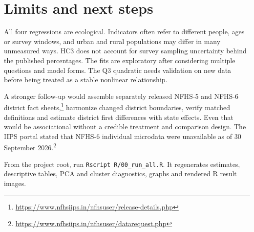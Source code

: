 \documentclass[11pt,a4paper]{article}
\begin{document}
\section{Limits and next steps}

All four regressions are ecological. Indicators often refer to
different people, ages or survey windows, and urban and rural
populations may differ in many unmeasured ways. HC3 does not account
for survey sampling uncertainty behind the published percentages.
The fits are exploratory after considering multiple questions and
model forms. The Q3 quadratic needs validation on new data before
being treated as a stable nonlinear relationship.

A stronger follow-up would assemble separately released NFHS-5
and NFHS-6 district fact sheets,\footnote{\url{https://www.nfhsiips.in/nfhsuser/release-details.php}}
harmonize changed district boundaries, verify matched definitions
and estimate district first differences with state effects. Even
that would be associational without a credible treatment and
comparison design. The IIPS portal stated that NFHS-6 individual
microdata were unavailable as of 30 September 2026.\footnote{\url{https://www.nfhsiips.in/nfhsuser/datarequest.php}}

From the project root, run \texttt{Rscript R/00\_run\_all.R}.
It regenerates estimates, descriptive tables, PCA and cluster
diagnostics, graphs and rendered R result images.
\end{document}
